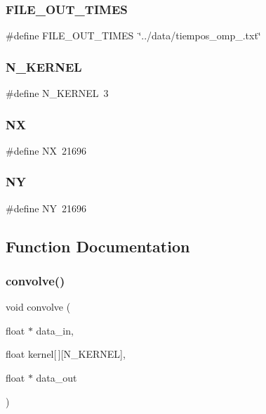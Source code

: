 \subsubsection{F\+I\+L\+E\+\_\+\+O\+U\+T\+\_\+\+T\+I\+M\+ES}
{\footnotesize\ttfamily \#define F\+I\+L\+E\+\_\+\+O\+U\+T\+\_\+\+T\+I\+M\+ES~\char`\"{}../data/tiempos\+\_\+omp\+\_.\+txt\char`\"{}}

\mbox{\label{main_8c_a250de86d225826237eaff8637ee6c3ea}} 
\subsubsection{N\+\_\+\+K\+E\+R\+N\+EL}
{\footnotesize\ttfamily \#define N\+\_\+\+K\+E\+R\+N\+EL~3}

\mbox{\label{main_8c_a4a9d32ff035c82119003134767948ebf}} 
\subsubsection{NX}
{\footnotesize\ttfamily \#define NX~21696}

\mbox{\label{main_8c_a652e87ecc9140879666ae9d6bf4ca893}} 
\subsubsection{NY}
{\footnotesize\ttfamily \#define NY~21696}



\subsection{Function Documentation}
\mbox{\label{main_8c_af3ba38684e66acbd4190dbd55e6228da}} 
\subsubsection{convolve()}
{\footnotesize\ttfamily void convolve (\begin{DoxyParamCaption}\item[{float $\ast$}]{data\+\_\+in,  }\item[{float}]{kernel[$\,$][\+N\+\_\+\+K\+E\+R\+N\+E\+L],  }\item[{float $\ast$}]{data\+\_\+out }\end{DoxyParamCaption})}



